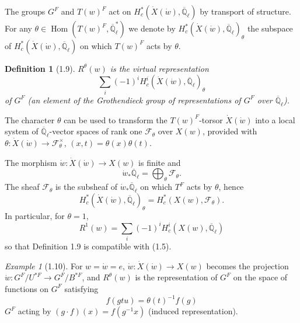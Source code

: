 \documentclass[11pt]{amsart}
\theoremstyle{plain}
\newtheorem{definition}[theorem]{Definition}
\theoremstyle{remark}
\newtheorem{example}[theorem]{Example}
\DeclareMathOperator{\Hom}{Hom}
\begin{document}
The groups $G^F$ and $T(w)^F$ act on $H_c^*(\dot{X}(\dot{w}), \overline{\mathbb{Q}}_\ell)$ by transport of structure. For any $\theta \in \Hom(T(w)^F, \overline{\mathbb{Q}}_\ell^*)$ we denote by $H_c^*(\dot{X}(\dot{w}), \overline{\mathbb{Q}}_\ell)_\theta$ the subspace of $H_c^*(\dot{X}(\dot{w}), \overline{\mathbb{Q}}_\ell)$ on which $T(w)^F$ acts by $\theta$.

\begin{definition}[1.9]
$R^\theta(w)$ is the virtual representation
\[
\sum_i (-1)^i H_c^i(\dot{X}(\dot{w}), \overline{\mathbb{Q}}_\ell)_\theta
\]
of $G^F$ (an element of the Grothendieck group of representations of $G^F$ over $\overline{\mathbb{Q}}_\ell$).
\end{definition}

The character $\theta$ can be used to transform the $T(w)^F$-torsor $\dot{X}(\dot{w})$ into a local system of $\overline{\mathbb{Q}}_\ell$-vector spaces of rank one $\mathcal{F}_\theta$ over $X(w)$, provided with $\theta: \dot{X}(\dot{w}) \to \mathcal{F}_\theta^\times$, $(x, t) = \theta(x)\theta(t)$.

The morphism $\dot{w}: \dot{X}(\dot{w}) \to X(w)$ is finite and
\[
\dot{w}_* \overline{\mathbb{Q}}_\ell = \bigoplus_\theta \mathcal{F}_\theta.
\]
The sheaf $\mathcal{F}_\theta$ is the subsheaf of $\dot{w}_* \overline{\mathbb{Q}}_\ell$ on which $T^F$ acts by $\theta$, hence
\[
H_c^*(\dot{X}(\dot{w}), \overline{\mathbb{Q}}_\ell)_\theta = H_c^*(X(w), \mathcal{F}_\theta).
\]
In particular, for $\theta = 1$,
\[
R^1(w) = \sum_i (-1)^i H_c^i(X(w), \overline{\mathbb{Q}}_\ell)
\]
so that Definition 1.9 is compatible with (1.5).

\begin{example}[1.10]
For $w = \dot{w} = e$, $\dot{w}: \dot{X}(\dot{w}) \to X(w)$ becomes the projection $\dot{w}: G^F/U^{*F} \to G^F/B^{*F}$, and $R^\theta(w)$ is the representation of $G^F$ on the space of functions on $G^F$ satisfying
\[
f(gtu) = \theta(t)^{-1}f(g)
\]
$G^F$ acting by $(g \cdot f)(x) = f(g^{-1}x)$ (induced representation).
\end{example}
\end{document}
